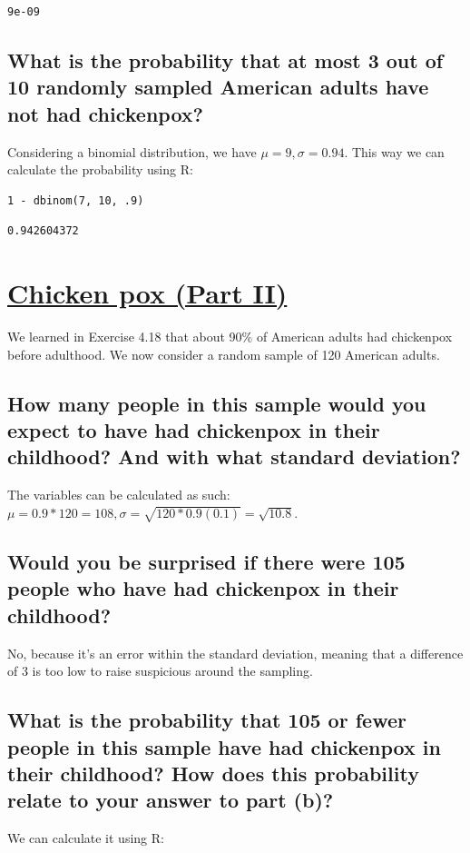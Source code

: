 \documentclass[11pt]{article}
\begin{document}
\begin{verbatim}
9e-09
\end{verbatim}

\subsection{What is the probability that at most 3 out of 10 randomly sampled American adults have not had chickenpox?}
\label{sec:orgd150f31}
Considering a binomial distribution, we have \(\mu = 9, \sigma = 0.94\). This way we can calculate the probability using R:

\begin{verbatim}
1 - dbinom(7, 10, .9)
\end{verbatim}

\begin{verbatim}
0.942604372
\end{verbatim}

\section{\underline{Chicken pox (Part II)}}
\label{sec:org611b05e}
We learned in Exercise 4.18 that about 90\% of American adults had chickenpox before adulthood. We now consider a random sample of 120 American adults.

\subsection{How many people in this sample would you expect to have had chickenpox in their childhood? And with what standard deviation?}
\label{sec:org979710a}
The variables can be calculated as such: \(\mu = 0.9 * 120 = 108, \sigma = \sqrt{120*0.9(0.1)} = \sqrt{10.8}\).
\subsection{Would you be surprised if there were 105 people who have had chickenpox in their childhood?}
\label{sec:orgd842010}
No, because it's an error within the standard deviation, meaning that a difference of 3 is too low to raise suspicious around the sampling.
\subsection{What is the probability that 105 or fewer people in this sample have had chickenpox in their childhood? How does this probability relate to your answer to part (b)?}
\label{sec:orgc010b05}
We can calculate it using R:
\end{document}
